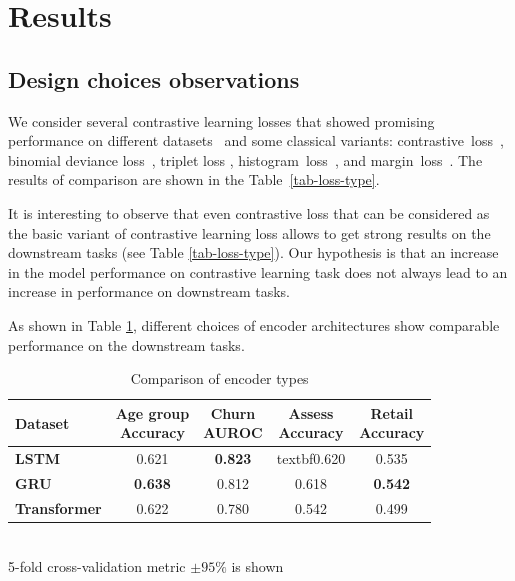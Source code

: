 \documentclass[sigconf]{acmart}
\begin{document}
\section{Results} \label{app-sec-res}

\subsection{Design choices observations} \label{app-sec-design}

We consider several contrastive learning losses that showed promising performance on different datasets~\citep{Kaya2019DeepML} and some classical variants: contrastive~loss~\citep{Hadsell2006DimensionalityRB}, binomial deviance loss~\citep{Yi2014DeepML}, triplet loss \citep{Hoffer2015DeepML}, histogram~loss~\citep{Ustinova2016LearningDE}, and margin~loss~\citep{Manmatha2017SamplingMI}. The results of comparison are shown in the Table~\ref{tab-loss-type}.

It is interesting to observe that even contrastive loss that can be considered as the basic variant of contrastive learning loss allows to get strong results on the downstream tasks (see Table \ref{tab-loss-type}). Our hypothesis is that an increase in the model performance on contrastive learning task does not always lead to an increase in performance on downstream tasks.

As shown in Table \ref{tab-enc-type}, different choices of encoder architectures show comparable performance on the downstream tasks.

\begin{table}
\centering
\caption{Comparison of encoder types}
\begin{tabular}{lcccc}

\toprule
\textbf{Dataset} &
\makecell{\textbf{Age group} \\ \small{Accuracy}} &
\makecell{\textbf{Churn} \\ \small{AUROC}} &
\makecell{\textbf{Assess} \\ \small{Accuracy}} &
\makecell{\textbf{Retail} \\ \small{Accuracy}} \\
\midrule

\textbf{LSTM} & 0.621 & \textbf{0.823} & textbf{0.620} & 0.535 \\
\textbf{GRU} & \textbf{0.638} & 0.812 & 0.618 & \textbf{0.542} \\
\textbf{Transformer} & 0.622 & 0.780 & 0.542 & 0.499 \\

\bottomrule
\end{tabular} \\
\small{5-fold cross-validation metric $\pm 95\%$ is shown}
\label{tab-enc-type}
\end{table}
\end{document}
